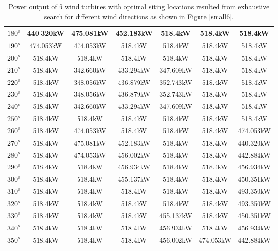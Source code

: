 \begin{table}[H]
\begin{tabular}{|c|c|c|c|c|c|c|}
        		$180^o$	& 440.320kW	& 475.081kW	& 452.183kW	& 518.4kW	& 518.4kW	& 518.4kW	\\ \hline
        		$190^o$	& 474.053kW	& 474.053kW	& 518.4kW	& 518.4kW	& 518.4kW	& 518.4kW	\\ \hline
        		$200^o$	& 518.4kW	& 518.4kW	& 518.4kW	& 518.4kW	& 518.4kW	& 518.4kW	\\ \hline
        		$210^o$	& 518.4kW	& 342.660kW	& 433.294kW	& 347.609kW	& 518.4kW	& 518.4kW	\\ \hline
        		$220^o$	& 518.4kW	& 348.056kW	& 436.879kW	& 352.743kW	& 518.4kW	& 518.4kW	\\ \hline
        		$230^o$	& 518.4kW	& 348.056kW	& 436.879kW	& 352.743kW	& 518.4kW	& 518.4kW	\\ \hline
        		$240^o$	& 518.4kW	& 342.660kW	& 433.294kW	& 347.609kW	& 518.4kW	& 518.4kW	\\ \hline
        		$250^o$	& 518.4kW	& 518.4kW	& 518.4kW	& 518.4kW	& 518.4kW	& 518.4kW	\\ \hline
        		$260^o$	& 518.4kW	& 474.053kW	& 518.4kW	& 518.4kW	& 518.4kW	& 474.053kW	\\ \hline
        		$270^o$	& 518.4kW	& 475.081kW	& 452.183kW	& 518.4kW	& 518.4kW	& 440.320kW	\\ \hline
        		$280^o$	& 518.4kW	& 474.053kW	& 456.002kW	& 518.4kW	& 518.4kW	& 442.884kW	\\ \hline
        		$290^o$	& 518.4kW	& 518.4kW	& 456.934kW	& 518.4kW	& 518.4kW	& 456.934kW	\\ \hline
        		$300^o$	& 518.4kW	& 518.4kW	& 455.137kW	& 518.4kW	& 518.4kW	& 450.351kW	\\ \hline
        		$310^o$	& 518.4kW	& 518.4kW	& 518.4kW	& 518.4kW	& 518.4kW	& 493.350kW	\\ \hline
        		$320^o$	& 518.4kW	& 518.4kW	& 518.4kW	& 518.4kW	& 518.4kW	& 493.350kW	\\ \hline
        		$330^o$	& 518.4kW	& 518.4kW	& 518.4kW	& 455.137kW	& 518.4kW	& 450.351kW	\\ \hline
        		$340^o$	& 518.4kW	& 518.4kW	& 518.4kW	& 456.934kW	& 518.4kW	& 456.934kW	\\ \hline
        		$350^o$	& 518.4kW	& 518.4kW	& 518.4kW	& 456.002kW	& 474.053kW	& 442.884kW	\\ \hline
        	\end{tabular}
        	\caption{Power output of 6 wind turbines with optimal siting locations resulted from exhaustive search for different wind directions as shown in Figure \ref{small6}.}
        	\label{table6}
        \end{table}
        \doublespacing
        
